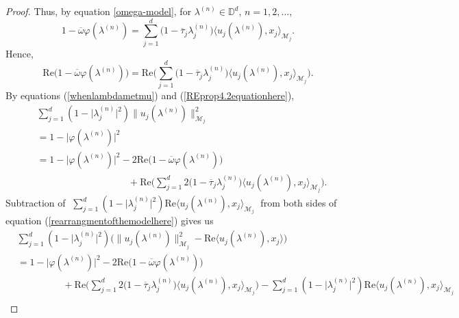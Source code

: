 \documentclass[10pt,a4paper]{amsart}
\begin{document}
\begin{proof}
Thus,  by equation \eqref{omega-model},
   for $\lambda^{(n)}\in\mathbb{D}^{d}$, $n=1,2,\dots$,
\begin{equation}\label{prop4.2equationhere}
1-\overline{\omega}\varphi(\lambda^{(n)})=\sum_{j=1}^{d}\Big(1-\overline{\tau}_{j}\lambda^{(n)}_{j}\Big)\langle u_{j}(\lambda^{(n)}),x_{j}\rangle_{\mathcal{M}_{j}}.
\end{equation}
Hence,
\begin{equation}\label{REprop4.2equationhere}
\mathrm{Re}\bigg(1-\overline{\omega}\varphi(\lambda^{(n)})\bigg)=\mathrm{Re}\bigg(\sum_{j=1}^{d}\Big(1-\overline{\tau}_{j}\lambda^{(n)}_{j}\Big)\langle u_{j}(\lambda^{(n)}),x_{j}\rangle_{\mathcal{M}_{j}}\bigg).
\end{equation}
By equations (\ref{whenlambdametmu}) and (\ref{REprop4.2equationhere}),
\begin{align}
&\sum_{j=1}^{d}(1-\lvert \lambda_{j}^{(n)} \rvert^{2})\|u_{j}(\lambda^{(n)})\|_{\mathcal{M}_{j}}^{2}\nonumber\\
&= 1-\lvert \varphi(\lambda^{(n)}) \rvert^{2} \nonumber\\
&= 1-\lvert \varphi(\lambda^{(n)}) \rvert^{2}-2\mathrm{Re}\big(1-\overline{\omega}\varphi(\lambda^{(n)})\big)\nonumber\\
&\hspace{4cm}+ \mathrm{Re}\bigg(\sum_{j=1}^{d}2\Big(1-\overline{\tau}_{j}\lambda^{(n)}_{j}\Big)\langle u_{j}(\lambda^{(n)}),x_{j}\rangle_{\mathcal{M}_{j}}\bigg).
\label{rearrangmentofthemodelhere}
\end{align}
Subtraction of  $\; \sum_{j=1}^{d}(1-\lvert\lambda^{(n)}_{j}\rvert^{2})\mathrm{Re} \langle u_{j}(\lambda^{(n)}),x_{j}\rangle_{\mathcal{M}_{j}} \;$ from both sides of equation (\ref{rearrangmentofthemodelhere}) gives us 
\begin{align}
&\sum_{j=1}^{d}(1-\lvert \lambda^{(n)}_{j} \rvert^{2})\Big(\|u_{j}(\lambda^{(n)})\|_{\mathcal{M}_{j}}^{2}-\mathrm{Re}\langle u_{j}(\lambda^{(n)}),x_{j}\rangle  \Big)\nonumber\\
&=1-\lvert \varphi(\lambda^{(n)}) \rvert^{2}-2\mathrm{Re}\big(1-\overline{\omega}\varphi(\lambda^{(n)})\big)\nonumber\\
&\hspace{2cm}+ \mathrm{Re}\bigg(\sum_{j=1}^{d}2\Big(1-\overline{\tau}_{j}\lambda^{(n)}_{j}\Big)\langle u_{j}(\lambda^{(n)}),x_{j}\rangle_{\mathcal{M}_{j}}\bigg) - \sum_{j=1}^{d}(1-\lvert\lambda^{(n)}_{j}\rvert^{2})
\mathrm{Re} \langle u_{j}(\lambda^{(n)}),x_{j}\rangle_{\mathcal{M}_{j}} \nonumber \\

\end{align}
\end{proof}
\end{document}
